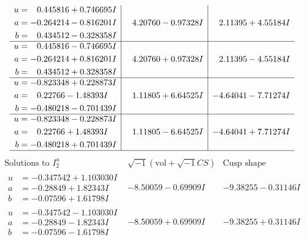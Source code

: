 \documentclass[1p]{elsarticle_modified}
\theoremstyle{definition}
\newcommand{\I}{\sqrt{-1}}
\begin{document}
$$\begin{array}{c|c|c}
\begin{aligned}
u &= \phantom{-}0.445816 + 0.746695 I \\
a &= -0.264214 - 0.816201 I \\
b &= \phantom{-}0.434512 - 0.328358 I\end{aligned}
 & \phantom{-}4.20760 - 0.97328 I & \phantom{-}2.11395 + 4.55184 I \\ \hline\begin{aligned}
u &= \phantom{-}0.445816 - 0.746695 I \\
a &= -0.264214 + 0.816201 I \\
b &= \phantom{-}0.434512 + 0.328358 I\end{aligned}
 & \phantom{-}4.20760 + 0.97328 I & \phantom{-}2.11395 - 4.55184 I \\ \hline\begin{aligned}
u &= -0.823348 + 0.228873 I \\
a &= \phantom{-}0.22766 - 1.48393 I \\
b &= -0.480218 - 0.701439 I\end{aligned}
 & \phantom{-}1.11805 + 6.64525 I & -4.64041 - 7.71274 I \\ \hline\begin{aligned}
u &= -0.823348 - 0.228873 I \\
a &= \phantom{-}0.22766 + 1.48393 I \\
b &= -0.480218 + 0.701439 I\end{aligned}
 & \phantom{-}1.11805 - 6.64525 I & -4.64041 + 7.71274 I\\
 \hline 
 \end{array}$$\newpage$$\begin{array}{c|c|c}  
\text{Solutions to }I^u_{2}& \I (\text{vol} + \sqrt{-1}CS) & \text{Cusp shape}\\
 \hline 
\begin{aligned}
u &= -0.347542 + 1.103030 I \\
a &= -0.28849 + 1.82343 I \\
b &= -0.07596 + 1.61798 I\end{aligned}
 & -8.50059 - 0.69909 I & -9.38255 - 0.31146 I \\ \hline\begin{aligned}
u &= -0.347542 - 1.103030 I \\
a &= -0.28849 - 1.82343 I \\
b &= -0.07596 - 1.61798 I\end{aligned}
 & -8.50059 + 0.69909 I & -9.38255 + 0.31146 I \\ \hline\begin{aligned}

\end{aligned}
\end{array}$$
\end{document}
